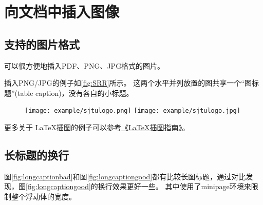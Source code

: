 \section{向文档中插入图像}
\label{sec:insertimage}

\subsection{支持的图片格式}
\label{sec:imageformat}

\XeTeX 可以很方便地插入PDF、PNG、JPG格式的图片。

插入PNG/JPG的例子如\ref{fig:SRR}所示。
这两个水平并列放置的图共享一个“图标题”(table caption)，没有各自的小标题。

\begin{figure}[!htp]
  \centering
  \texttt{[image: example/sjtulogo.png]}
  \hspace{1cm}
  \texttt{[image: example/sjtulogo.jpg]}
\end{figure}

% 

更多关于 \LaTeX 插图的例子可以参考\href{http://www.cs.duke.edu/junhu/Graphics3.pdf}{《\LaTeX 插图指南》}。

\subsection{长标题的换行}
\label{sec:longcaption}

图\ref{fig:longcaptionbad}和图\ref{fig:longcaptiongood}都有比较长图标题，通过对比发现，图\ref{fig:longcaptiongood}的换行效果更好一些。
其中使用了minipage环境来限制整个浮动体的宽度。

